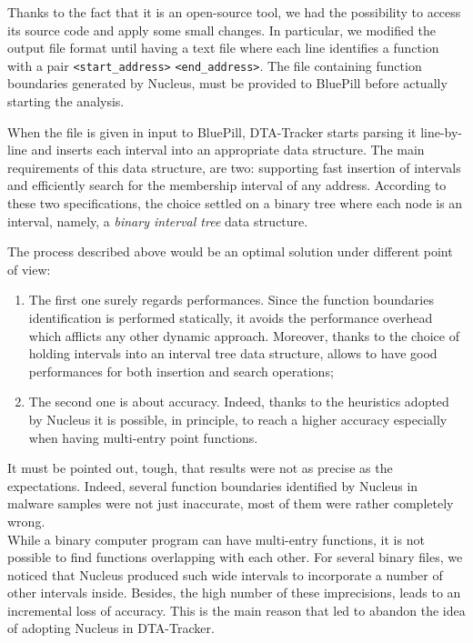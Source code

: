 \documentclass[LaM,binding=0.6cm]{sapthesis}
\begin{document}
Thanks to the fact that it is an open-source tool, we had the possibility to access its source code and apply some small changes. In particular, we modified the output file format until having a text file where each line identifies a function with a pair \texttt{<start\_address>} \texttt{<end\_address>}. The file containing function boundaries generated by Nucleus, must be provided to BluePill before actually starting the analysis.

When the file is given in input to BluePill, {\sf DTA-Tracker} starts parsing it line-by-line and inserts each interval into an appropriate data structure. The main requirements of this data structure, are two: supporting fast insertion of intervals and efficiently search for the membership interval of any address. According to these two specifications, the choice settled on a binary tree where each node is an interval, namely, a \textit{binary interval tree} data structure.

The process described above would be an optimal solution under different point of view:
\begin{enumerate}
\item The first one surely regards performances. Since the function boundaries identification is performed statically, it avoids the performance overhead which afflicts any other dynamic approach. Moreover, thanks to the choice of holding intervals into an interval tree data structure, allows to have good performances for both insertion and search operations;
\item The second one is about accuracy. Indeed, thanks to the heuristics adopted by Nucleus it is possible, in principle, to reach a higher accuracy especially when having multi-entry point functions.
\end{enumerate}
It must be pointed out, tough, that results were not as precise as the expectations. Indeed, several function boundaries identified by Nucleus in  malware samples were not just inaccurate, most of them were rather completely wrong.\\

While a binary computer program can have multi-entry functions, it is not possible to find functions overlapping with each other. For several binary files, we noticed that Nucleus produced such wide intervals to incorporate a number of other intervals inside. Besides, the high number of these imprecisions, leads to an incremental loss of accuracy. This is the main reason that led to abandon the idea of adopting Nucleus in {\sf DTA-Tracker}.
\end{document}
